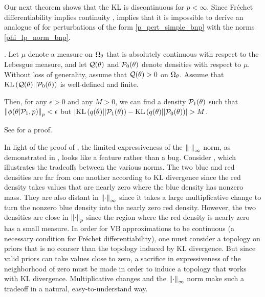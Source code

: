Our next theorem shows that the KL is discontinuous for $p < \infty$.
Since Fr{\'e}chet differentiability implies continuity \citep[Proposition 4.8
(d)]{zeidler:2013:functional},  implies that it is
impossible to derive an analogue of  for perturbations of
the form \eqref{p_pert_simple_bnp} with the norms \eqref{phi_lp_norm_bnp}.
%
\begin{thm}
%
. Let $\mu$ denote a measure on $\Omega_{\theta}$ that is
absolutely continuous with respect to the Lebesgue measure, and let $\mathcal{Q}(\theta)$
and $\mathcal{P}_{0}(\theta)$ denote densities with respect to $\mu$.  Without loss of
generality, assume that $\mathcal{Q}(\theta) > 0$ on $\Omega_{\theta}$.  Assume that
$\mathrm{KL}\left(\mathcal{Q}(\theta) || \mathcal{P}_{0}(\theta)\right)$ is well-defined and finite.

Then, for any $\epsilon > 0$ and any $M > 0$, we can find a density
$\mathcal{P}_{1}(\theta)$ such that $\left\Vert\phi(\theta \vert \mathcal{P}_{1}, p)\right\Vert_p < \epsilon$ but
$\left|\mathrm{KL}\left(q(\theta) || \mathcal{P}_{1}(\theta)\right) - \mathrm{KL}\left(q(\theta) || \mathcal{P}_{0}(\theta)\right)\right| > M$.
%
\end{thm}
%
See  for a proof.

In light of the proof of , the limited
expressiveness of the $\left\Vert\cdot\right\Vert_{\infty}$ norm, as demonstrated in
, 
looks like a feature rather than a bug.
Consider , which illustrates the tradeoffs between the
various norms.  The two blue and red densities are far from one another
according to KL divergence since the red density takes values that are nearly
zero where the blue density has nonzero mass. They are also distant in
$\left\Vert\cdot\right\Vert_{\infty}$ since it takes a large multiplicative change to turn the
nonzero blue density into the nearly zero red density. However, the two
densities are close in $\left\Vert\cdot\right\Vert_{p}$ since the region where the red density
is nearly zero has a small measure. In order for VB approximations to be
continuous (a necessary condition for Fr{\'e}chet differentiability), one must
consider a topology on priors that is no coarser than the topology induced by KL
divergence.  But since valid priors can take values close to zero, a sacrifice
in expressiveness of the neighborhood of zero must be made in order to induce a
topology that works with KL divergence. Multiplicative changes and the
$\left\Vert\cdot\right\Vert_{\infty}$ norm make such a tradeoff in a natural, easy-to-understand
way.

